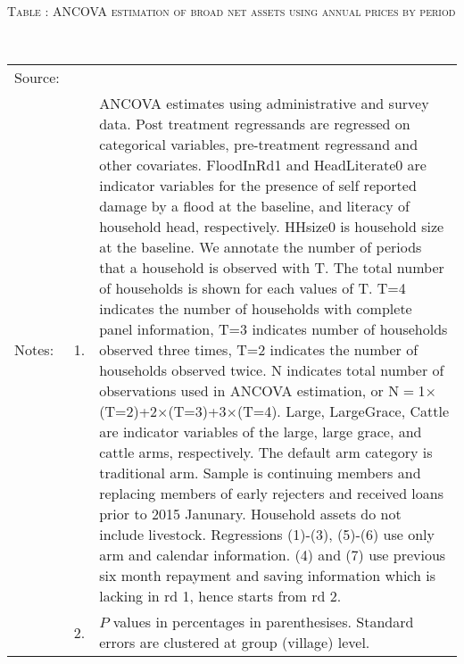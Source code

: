 \hspace{-1cm}\begin{minipage}[t]{14cm}
\hfil\textsc{\normalsize Table \thetable: ANCOVA estimation of broad net assets using annual prices by period\label{tab ANCOVA net assets using annual prices timevarying}}\\
\setlength{\tabcolsep}{1pt}
\setlength{\baselineskip}{8pt}
\renewcommand{\arraystretch}{.55}
\hfil{}\\
\renewcommand{\arraystretch}{.8}
\setlength{\tabcolsep}{1pt}
\begin{tabular}{>{\hfill\scriptsize}p{1cm}<{}>{\hfill\scriptsize}p{.25cm}<{}>{\scriptsize}p{12cm}<{\hfill}}
Source:& \multicolumn{2}{l}{\scriptsize Estimated with GUK administrative and survey data.}\\
Notes: & 1. & ANCOVA estimates using administrative and survey data. Post treatment regressands are regressed on categorical variables, pre-treatment regressand and other covariates. \textsf{FloodInRd1} and \textsf{HeadLiterate0} are indicator variables for the presence of self reported damage by a flood at the baseline, and literacy of household head, respectively. \textsf{HHsize0} is household size at the baseline. We annotate the number of periods that a household is observed with \textsf{T}. The total number of households is shown for each values of \textsf{T}. \textsf{T=4} indicates the number of households with complete panel information, \textsf{T=3} indicates number of households observed three times, \textsf{T=2} indicates the number of households observed twice. \textsf{N} indicates total number of observations used in ANCOVA estimation, or \textsf{N$=$1$\times$(T=2)+2$\times$(T=3)+3$\times$(T=4)}.  \textsf{Large}, \textsf{LargeGrace}, \textsf{Cattle} are indicator variables of the \textsf{large}, \textsf{large grace}, and \textsf{cattle} arms, respectively. The default arm category is \textsf{traditional} arm. Sample is continuing members and replacing members of early rejecters and received loans prior to 2015 Janunary. Household assets do not include livestock. Regressions (1)-(3), (5)-(6) use only arm and calendar information. (4) and (7) use previous six month repayment and saving information which is lacking in rd 1, hence starts from rd 2.\\
& 2. & $P$ values in percentages in parenthesises. Standard errors are clustered at group (village) level.
\end{tabular}
\end{minipage}

